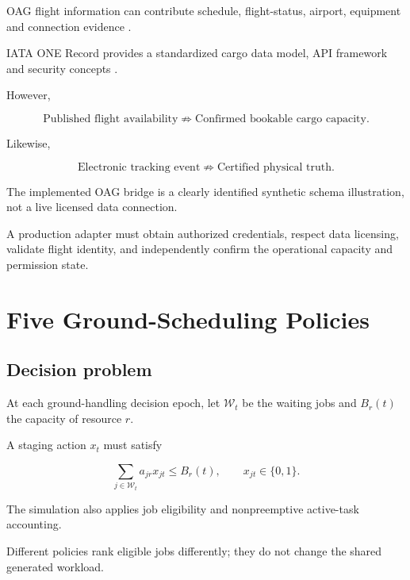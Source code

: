 \documentclass[10pt,a4paper]{article}
\theoremstyle{plain}
\theoremstyle{definition}
\theoremstyle{remark}
\begin{document}
OAG flight information can contribute
schedule, flight-status, airport,
equipment and connection evidence
\cite{oagportal}.

IATA ONE Record provides a
standardized cargo data model,
API framework and security concepts
\cite{onerecord}.

However,

\begin{equation}
\text{Published flight availability}
\not\Rightarrow
\text{Confirmed bookable cargo capacity}.
\end{equation}

Likewise,

\begin{equation}
\text{Electronic tracking event}
\not\Rightarrow
\text{Certified physical truth}.
\end{equation}

The implemented OAG bridge is a
clearly identified synthetic schema
illustration, not a live
licensed data connection.

A production adapter must obtain
authorized credentials, respect
data licensing, validate flight identity,
and independently confirm the
operational capacity and permission state.

\section{Five Ground-Scheduling Policies}

\subsection{Decision problem}

At each ground-handling decision epoch,
let \(\mathcal W_t\) be the waiting jobs
and \(B_r(t)\) the capacity
of resource \(r\).

A staging action \(x_t\)
must satisfy

\begin{equation}
\sum_{j\in\mathcal W_t}
a_{jr}x_{jt}
\leq B_r(t),
\qquad
x_{jt}\in\{0,1\}.
\label{eq:staging-resource}
\end{equation}

The simulation also applies
job eligibility and nonpreemptive
active-task accounting.

Different policies rank eligible
jobs differently;
they do not change the shared
generated workload.
\end{document}

